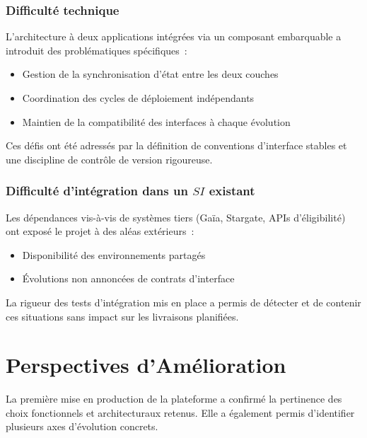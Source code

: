 \subsubsection*{Difficult\'e technique}

L'architecture \`a deux applications int\'egr\'ees via un composant embarquable a introduit des probl\'ematiques sp\'ecifiques~:

\begin{itemize}
  \item Gestion de la synchronisation d'\'etat entre les deux couches
  \item Coordination des cycles de d\'eploiement ind\'ependants
  \item Maintien de la compatibilit\'e des interfaces \`a chaque \'evolution
\end{itemize}

Ces d\'efis ont \'et\'e adress\'es par la d\'efinition de conventions d'interface stables et une discipline de contr\^ole de version rigoureuse.
 
\subsubsection*{Difficult\'e d'int\'egration dans un \(SI\) existant}

Les d\'ependances vis-\`a-vis de syst\`emes tiers (Ga\"ia, Stargate, APIs d'\'eligibilit\'e) ont expos\'e le projet \`a des al\'eas ext\'erieurs~:

\begin{itemize}
  \item Disponibilit\'e des environnements partag\'es
  \item \'Evolutions non annonc\'ees de contrats d'interface
\end{itemize}

La rigueur des tests d'int\'egration mis en place a permis de d\'etecter et de contenir ces situations sans impact sur les livraisons planifi\'ees.
 
\section{Perspectives d'Am\'elioration}
 
La premi\`ere mise en production de la plateforme a confirm\'e la pertinence des choix fonctionnels et architecturaux retenus. Elle a \'egalement permis d'identifier plusieurs axes d'\'evolution concrets.
 
